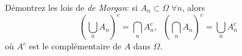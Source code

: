 
\begin{exercice}\label{exo0075}

Démontrez les lois de {\it de Morgan}: si $A_n\subset\Omega \; \forall n$,  alors
\[
\left(\bigcup_n A_n\right)^c = \bigcap_n A_n^c,\; \;  \left(\bigcap_n A_n\right)^c = \bigcup_n A_n^c
\]
où $A^c$ est le complémentaire de $A$ dans $\Omega$.

\end{exercice}

